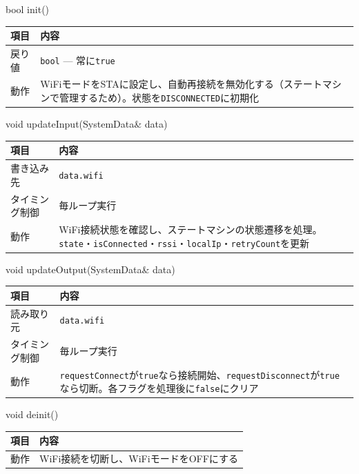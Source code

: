 \begin{funcblock}{bool init()}
\begin{tabularx}{\textwidth}{l X}
\toprule
\textbf{項目} & \textbf{内容} \\
\midrule
戻り値   & \texttt{bool} --- 常に\texttt{true} \\
動作     & WiFiモードをSTAに設定し、自動再接続を無効化する（ステートマシンで管理するため）。状態を\texttt{DISCONNECTED}に初期化 \\
\bottomrule
\end{tabularx}
\end{funcblock}

\begin{funcblock}{void updateInput(SystemData\& data)}
\begin{tabularx}{\textwidth}{l X}
\toprule
\textbf{項目} & \textbf{内容} \\
\midrule
書き込み先     & \texttt{data.wifi} \\
タイミング制御 & 毎ループ実行 \\
動作           & WiFi接続状態を確認し、ステートマシンの状態遷移を処理。\texttt{state}・\texttt{isConnected}・\texttt{rssi}・\texttt{localIp}・\texttt{retryCount}を更新 \\
\bottomrule
\end{tabularx}
\end{funcblock}

\begin{funcblock}{void updateOutput(SystemData\& data)}
\begin{tabularx}{\textwidth}{l X}
\toprule
\textbf{項目} & \textbf{内容} \\
\midrule
読み取り元     & \texttt{data.wifi} \\
タイミング制御 & 毎ループ実行 \\
動作           & \texttt{requestConnect}が\texttt{true}なら接続開始、\texttt{requestDisconnect}が\texttt{true}なら切断。各フラグを処理後に\texttt{false}にクリア \\
\bottomrule
\end{tabularx}
\end{funcblock}

\begin{funcblock}{void deinit()}
\begin{tabularx}{\textwidth}{l X}
\toprule
\textbf{項目} & \textbf{内容} \\
\midrule
動作   & WiFi接続を切断し、WiFiモードをOFFにする \\
\bottomrule
\end{tabularx}
\end{funcblock}


